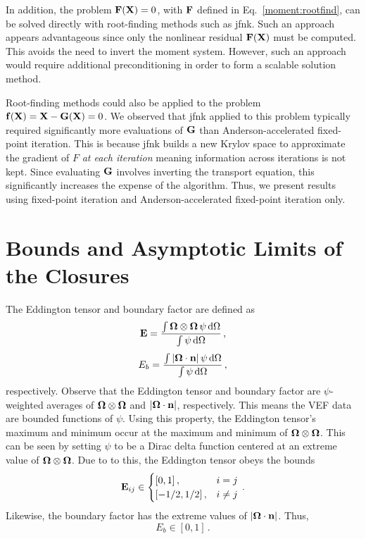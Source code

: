 \documentclass[../doc.tex]{subfiles}
\begin{document}
In addition, the problem $\boldsymbol{\mathrm{F}}(\boldsymbol{\mathrm{X}}) = 0$, with $\boldsymbol{\mathrm{F}}$ defined in Eq.~\ref{moment:rootfind}, can be solved directly with root-finding methods such as \gls{jfnk}. Such an approach appears advantageous since only the nonlinear residual $\boldsymbol{\mathrm{F}}(\boldsymbol{\mathrm{X}})$ must be computed. This avoids the need to invert the moment system. However, such an approach would require additional preconditioning in order to form a scalable solution method. 

Root-finding methods could also be applied to the problem $\boldsymbol{\mathrm{f}}(\boldsymbol{\mathrm{X}}) = \boldsymbol{\mathrm{X}} - \boldsymbol{\mathrm{G}}(\boldsymbol{\mathrm{X}}) = 0$. 
We observed that \gls{jfnk} applied to this problem typically required significantly more evaluations of $\boldsymbol{\mathrm{G}}$ than Anderson-accelerated fixed-point iteration. This is because \gls{jfnk} builds a new Krylov space to approximate the gradient of $F$ \emph{at each iteration} meaning information across iterations is not kept. Since evaluating $\boldsymbol{\mathrm{G}}$ involves inverting the transport equation, this significantly increases the expense of the algorithm. Thus, we present results using fixed-point iteration and Anderson-accelerated fixed-point iteration only. 

\section{Bounds and Asymptotic Limits of the Closures}
The Eddington tensor and boundary factor are defined as 
	\begin{equation}
		\boldsymbol{\mathrm{E}} = \frac{\int\boldsymbol{\Omega}\otimes\boldsymbol{\Omega}\,\psi \mathop{}\!\mathrm{d} \Omega}{\int \psi \mathop{}\!\mathrm{d} \Omega}\,,
	\end{equation}
	\begin{equation}
		E_b = \frac{\int|\boldsymbol{\Omega}\cdot\boldsymbol{\mathrm{n}}|\,\psi \mathop{}\!\mathrm{d} \Omega}{\int \psi \mathop{}\!\mathrm{d} \Omega} \,,
	\end{equation}
respectively. Observe that the Eddington tensor and boundary factor are $\psi$-weighted averages of $\boldsymbol{\Omega}\otimes\boldsymbol{\Omega}$ and $|\boldsymbol{\Omega}\cdot\boldsymbol{\mathrm{n}}|$, respectively. This means the VEF data are bounded functions of $\psi$. 
Using this property, the Eddington tensor's maximum and minimum occur at the maximum and minimum of $\boldsymbol{\Omega}\otimes\boldsymbol{\Omega}$. This can be seen by setting $\psi$ to be a Dirac delta function centered at an extreme value of $\boldsymbol{\Omega}\otimes\boldsymbol{\Omega}$. Due to to this, the Eddington tensor obeys the bounds 
	\begin{equation}
		\boldsymbol{\mathrm{E}}_{ij} \in \begin{cases}
			[0,1] \,, & i=j \\ 
			[-1/2,1/2] \,, & i\neq j
		\end{cases} \,. 
	\end{equation}
Likewise, the boundary factor has the extreme values of $|\boldsymbol{\Omega}\cdot\boldsymbol{\mathrm{n}}|$. Thus, 
	\begin{equation}
		E_b \in [0,1] \,. 
	\end{equation}
\end{document}

